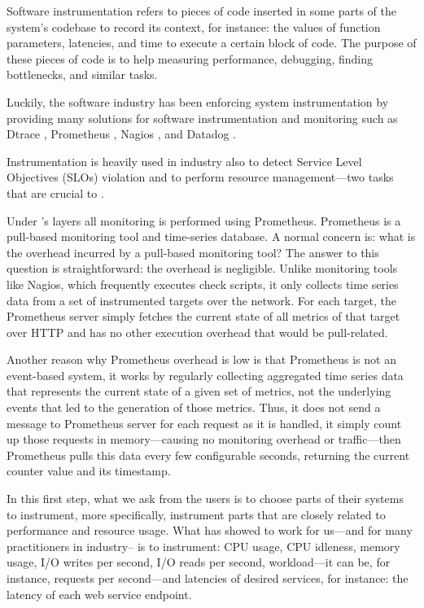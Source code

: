 Software instrumentation refers to pieces of code inserted in some parts of the system's codebase to record its context, for instance: the values of function parameters, latencies, and time to execute a certain block of code. The purpose of these pieces of code is to help measuring performance, debugging, finding bottlenecks, and similar tasks.

Luckily, the software industry has been enforcing system instrumentation by providing many solutions for software instrumentation and monitoring such as Dtrace \cite{cantrill_dynamic_2004}, Prometheus \cite{Prometheus}, Nagios \cite{Nagios}, and Datadog \cite{Datadog}.

Instrumentation is heavily used in industry also to detect Service Level Objectives (SLOs) violation and to perform resource management---two tasks that are crucial to \projectname{}.

Under \projectname{}'s layers all monitoring is performed using Prometheus. Prometheus is a pull-based monitoring tool and time-series database. A normal concern is: what is the overhead incurred by a pull-based monitoring tool? The answer to this question is straightforward: the overhead is negligible. Unlike monitoring tools like Nagios, which frequently executes check scripts, it only collects time series data from a set of instrumented targets over the network. For each target, the Prometheus server simply fetches the current state of all metrics of that target over HTTP and has no other execution overhead that would be pull-related.

Another reason why Prometheus overhead is low is that Prometheus is not an event-based system, it works by regularly collecting aggregated time series data that represents the current state of a given set of metrics, not the underlying events that led to the generation of those metrics. Thus, it does not send a message to Prometheus server for each request as it is handled, it simply count up those requests in memory---causing no monitoring overhead or traffic---then Prometheus pulls this data every few configurable seconds, returning the current counter value and its timestamp.

In this first step, what we ask from the users is to choose parts of their systems to instrument, more specifically, instrument parts that are closely related to performance and resource usage. What has showed to work for us---and for many practitioners in industry-- is to instrument: CPU usage, CPU idleness, memory usage, I/O writes per second, I/O reads per second, workload---it can be, for instance, requests per second---and latencies of desired services, for instance: the latency of each web service endpoint.


